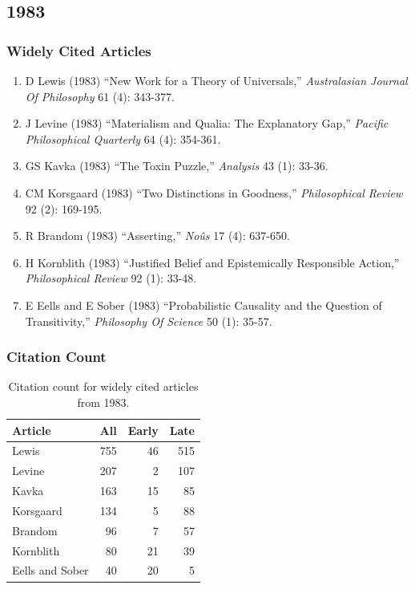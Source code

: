 \documentclass[
  10pt,
  letterpaper,
  DIV=11,
  numbers=noendperiod,
  twoside]{scrartcl}
\providecommand{\tightlist}{%
  \setlength{\itemsep}{0pt}\setlength{\parskip}{0pt}}\usepackage{longtable,booktabs,array}
\begin{document}
\newpage

\subsection{1983}\label{sec-s1983}

\subsubsection*{Widely Cited Articles}\label{widely-cited-articles-27}

\begin{enumerate}
\def\labelenumi{\arabic{enumi}.}
\tightlist
\item
  D Lewis (1983) ``New Work for a Theory of Universals,''
  \emph{Australasian Journal Of Philosophy} 61 (4): 343-377.
\item
  J Levine (1983) ``Materialism and Qualia: The Explanatory Gap,''
  \emph{Pacific Philosophical Quarterly} 64 (4): 354-361.
\item
  GS Kavka (1983) ``The Toxin Puzzle,'' \emph{Analysis} 43 (1): 33-36.
\item
  CM Korsgaard (1983) ``Two Distinctions in Goodness,''
  \emph{Philosophical Review} 92 (2): 169-195.
\item
  R Brandom (1983) ``Asserting,'' \emph{Noûs} 17 (4): 637-650.
\item
  H Kornblith (1983) ``Justified Belief and Epistemically Responsible
  Action,'' \emph{Philosophical Review} 92 (1): 33-48.
\item
  E Eells and E Sober (1983) ``Probabilistic Causality and the Question
  of Transitivity,'' \emph{Philosophy Of Science} 50 (1): 35-57.
\end{enumerate}

\subsubsection*{Citation Count}\label{sec-count-1983}

\begin{longtable}[]{@{}lrrr@{}}

\caption{\label{tbl-citation-count-1983}Citation count for widely cited
articles from 1983.}

\tabularnewline

\toprule\noalign{}
Article & All & Early & Late \\
\midrule\noalign{}
\endhead
\bottomrule\noalign{}
\endlastfoot
Lewis & 755 & 46 & 515 \\
Levine & 207 & 2 & 107 \\
Kavka & 163 & 15 & 85 \\
Korsgaard & 134 & 5 & 88 \\
Brandom & 96 & 7 & 57 \\
Kornblith & 80 & 21 & 39 \\
Eells and Sober & 40 & 20 & 5 \\

\end{longtable}
\end{document}
